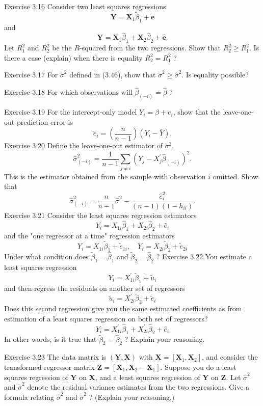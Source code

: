 \documentclass[10pt]{article}
\begin{document}
Exercise 3.16 Consider two least squares regressions
$$
\boldsymbol{Y}=\boldsymbol{X}_{1} \widetilde{\beta}_{1}+\widetilde{\boldsymbol{e}}
$$
and
$$
\boldsymbol{Y}=\boldsymbol{X}_{1} \widehat{\beta}_{1}+\boldsymbol{X}_{2} \widehat{\beta}_{2}+\widehat{\boldsymbol{e}} .
$$
Let $R_{1}^{2}$ and $R_{2}^{2}$ be the $R$-squared from the two regressions. Show that $R_{2}^{2} \geq R_{1}^{2}$. Is there a case (explain) when there is equality $R_{2}^{2}=R_{1}^{2}$ ?

Exercise 3.17 For $\widetilde{\sigma}^{2}$ defined in (3.46), show that $\widetilde{\sigma}^{2} \geq \widehat{\sigma}^{2}$. Is equality possible?

Exercise 3.18 For which observations will $\widehat{\beta}_{(-i)}=\widehat{\beta}$ ?

Exercise 3.19 For the intercept-only model $Y_{i}=\beta+e_{i}$, show that the leave-one-out prediction error is
$$
\widetilde{e}_{i}=\left(\frac{n}{n-1}\right)\left(Y_{i}-\bar{Y}\right) .
$$
Exercise 3.20 Define the leave-one-out estimator of $\sigma^{2}$,
$$
\widehat{\sigma}_{(-i)}^{2}=\frac{1}{n-1} \sum_{j \neq i}\left(Y_{j}-X_{j}^{\prime} \widehat{\beta}_{(-i)}\right)^{2} .
$$
This is the estimator obtained from the sample with observation $i$ omitted. Show that
$$
\widehat{\sigma}_{(-i)}^{2}=\frac{n}{n-1} \widehat{\sigma}^{2}-\frac{\widehat{e}_{i}^{2}}{(n-1)\left(1-h_{i i}\right)} .
$$
Exercise 3.21 Consider the least squares regression estimators
$$
Y_{i}=X_{1 i} \widehat{\beta}_{1}+X_{2 i} \widehat{\beta}_{2}+\widehat{e}_{i}
$$
and the "one regressor at a time" regression estimators
$$
Y_{i}=X_{1 i} \widetilde{\beta}_{1}+\widetilde{e}_{1 i}, \quad Y_{i}=X_{2 i} \widetilde{\beta}_{2}+\widetilde{e}_{2 i}
$$
Under what condition does $\widetilde{\beta}_{1}=\widehat{\beta}_{1}$ and $\widetilde{\beta}_{2}=\widehat{\beta}_{2}$ ? Exercise 3.22 You estimate a least squares regression
$$
Y_{i}=X_{1 i}^{\prime} \widetilde{\beta}_{1}+\widetilde{u}_{i}
$$
and then regress the residuals on another set of regressors
$$
\widetilde{u}_{i}=X_{2 i}^{\prime} \widetilde{\beta}_{2}+\widetilde{e}_{i}
$$
Does this second regression give you the same estimated coefficients as from estimation of a least squares regression on both set of regressors?
$$
Y_{i}=X_{1 i}^{\prime} \widehat{\beta}_{1}+X_{2 i}^{\prime} \widehat{\beta}_{2}+\widehat{e}_{i}
$$
In other words, is it true that $\widetilde{\beta}_{2}=\widehat{\beta}_{2}$ ? Explain your reasoning.

Exercise 3.23 The data matrix is $(\boldsymbol{Y}, \boldsymbol{X})$ with $\boldsymbol{X}=\left[\boldsymbol{X}_{1}, \boldsymbol{X}_{2}\right]$, and consider the transformed regressor matrix $\boldsymbol{Z}=\left[\boldsymbol{X}_{1}, \boldsymbol{X}_{2}-\boldsymbol{X}_{1}\right]$. Suppose you do a least squares regression of $\boldsymbol{Y}$ on $\boldsymbol{X}$, and a least squares regression of $\boldsymbol{Y}$ on $\boldsymbol{Z}$. Let $\widehat{\sigma}^{2}$ and $\widetilde{\sigma}^{2}$ denote the residual variance estimates from the two regressions. Give a formula relating $\widehat{\sigma}^{2}$ and $\widetilde{\sigma}^{2}$ ? (Explain your reasoning.)
\end{document}
